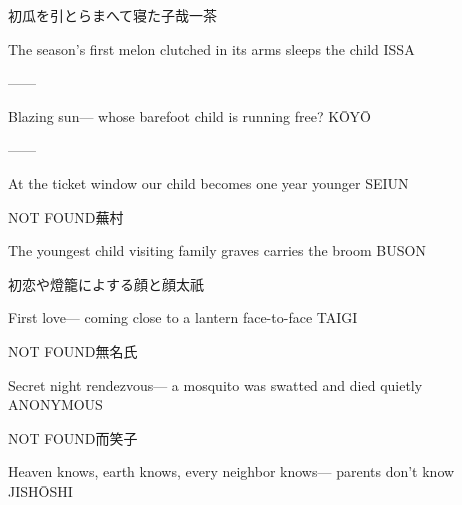 \begin{haiku}
    {\FH 初瓜を引とらまへて寝た子哉}\hfill{\FH 一茶}

    \vin{} The season's first melon
    \vin{} \vin{} clutched in its arms
    \vin{} \vin{} \vin{} sleeps the child \hspace{\fill} ISSA
\end{haiku}

\begin{haiku}
   ---\hfill{---}

    \vin{} Blazing sun---
    \vin{} \vin{} whose barefoot child
    \vin{} \vin{} \vin{} is running free? \hspace{\fill} K\={O}Y\={O}
\end{haiku}

\begin{haiku}
   ---\hfill{---}

    \vin{} At the ticket window
    \vin{} \vin{} our child becomes
    \vin{} \vin{} \vin{} one year younger \hspace{\fill} SEIUN
\end{haiku}

\begin{haiku}
    {NOT FOUND}\hfill{\FH 蕪村}

    \vin{} The youngest child
    \vin{} \vin{} visiting family graves
    \vin{} \vin{} \vin{} carries the broom \hspace{\fill} BUSON
\end{haiku}

\begin{haiku}
    {\FH 初恋や燈籠によする顔と顔}\hfill{\FH 太祇}

    \vin{} First love---
    \vin{} \vin{} coming close to a lantern
    \vin{} \vin{} \vin{} face-to-face \hspace{\fill} TAIGI
\end{haiku}

\begin{haiku}
    {NOT FOUND}\hfill{\FH 無名氏}

    \vin{} Secret night rendezvous---
    \vin{} \vin{} a mosquito was swatted
    \vin{} \vin{} \vin{} and died quietly \hspace{\fill} ANONYMOUS
\end{haiku}

\begin{haiku}
    {NOT FOUND}\hfill{\FH 而笑子}

    \vin{} Heaven knows,
    \vin{} \vin{} earth knows, every neighbor knows---
    \vin{} \vin{} \vin{} parents don't know \hspace{\fill} JISH\={O}SHI
\end{haiku}

